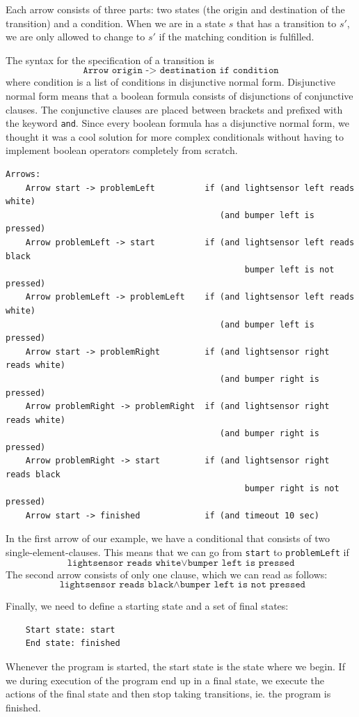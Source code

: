 \documentclass[11pt,a4paper]{article}
\begin{document}
Each arrow consists of three parts: two states (the origin and destination of the transition) and a condition. When we are in a state $s$ that has a transition to $s'$, we are only allowed to change to $s'$ if the matching condition is fulfilled. 

The syntax for the specification of a transition is
\[ \texttt{Arrow origin -> destination	if condition} \]
where condition is a list of conditions in disjunctive normal form. 
Disjunctive normal form means that a boolean formula consists of disjunctions of conjunctive clauses. The conjunctive clauses are placed between brackets and prefixed with the keyword \texttt{and}.
Since every boolean formula has a disjunctive normal form, we thought it was a cool solution for more complex conditionals without having to implement boolean operators completely from scratch. 

\begin{verbatim}
Arrows: 
    Arrow start -> problemLeft          if (and lightsensor left reads white) 
                                           (and bumper left is pressed)
    Arrow problemLeft -> start          if (and lightsensor left reads black 
                                                bumper left is not pressed)
    Arrow problemLeft -> problemLeft    if (and lightsensor left reads white) 
                                           (and bumper left is pressed)
    Arrow start -> problemRight         if (and lightsensor right reads white) 
                                           (and bumper right is pressed)
    Arrow problemRight -> problemRight  if (and lightsensor right reads white) 
                                           (and bumper right is pressed)
    Arrow problemRight -> start         if (and lightsensor right reads black 
                                                bumper right is not pressed)
    Arrow start -> finished             if (and timeout 10 sec)

\end{verbatim}

In the first arrow of our example, we have a conditional that consists of two single-element-clauses. This means that we can go from \texttt{start} to \texttt{problemLeft} if
\[ \texttt{lightsensor reads white} \vee \texttt{bumper left is pressed} \]
The second arrow consists of only one clause, which we can read as follows:
\[ \texttt{ lightsensor reads black} \wedge \texttt{bumper left is not pressed} \]

Finally, we need to define a starting state and a set of final states:
\begin{verbatim}
    Start state: start 
    End state: finished
\end{verbatim}
Whenever the program is started, the start state is the state where we begin. 
If we during execution of the program end up in a final state, we execute the actions of the final state and then stop taking transitions, ie. the program is finished.
\end{document}
